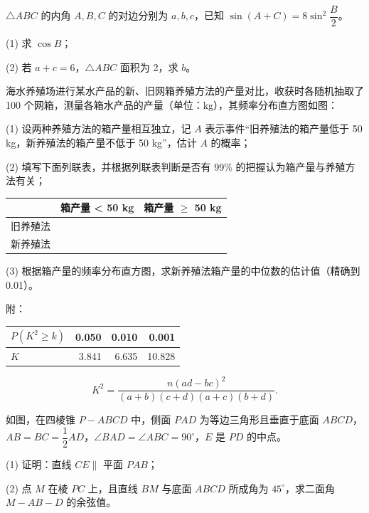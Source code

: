 \begin{question}
\(\triangle ABC\) 的内角 \(A,B,C\) 的对边分别为 \(a,b,c\)，已知 \(\sin(A+C)=8\sin^2\dfrac{B}{2}\)。

   (1) 求 \(\cos B\)；

   (2) 若 \(a+c=6\)，\(\triangle ABC\) 面积为 2，求 \(b\)。

\Needspace{0.4\textheight}
\end{question}
\begin{question}
海水养殖场进行某水产品的新、旧网箱养殖方法的产量对比，收获时各随机抽取了 100 个网箱，测量各箱水产品的产量（单位：kg），其频率分布直方图如图：
\nopagebreak[4]
\begin{center}\end{center}
\nopagebreak[4]
   (1) 设两种养殖方法的箱产量相互独立，记 \(A\) 表示事件“旧养殖法的箱产量低于 50 kg，新养殖法的箱产量不低于 50 kg”，估计 \(A\) 的概率；

   (2) 填写下面列联表，并根据列联表判断是否有 99\% 的把握认为箱产量与养殖方法有关；

\begin{center}
\begin{tabular}{lrr}
\toprule
 & 箱产量 < 50 kg & 箱产量 $\geq$ 50 kg \\
\midrule
旧养殖法 &  &  \\
新养殖法 &  &  \\
\bottomrule
\end{tabular}
\end{center}

   (3) 根据箱产量的频率分布直方图，求新养殖法箱产量的中位数的估计值（精确到 0.01）。

   附：

\begin{center}
\begin{tabular}{lrrr}
\toprule
\(P(K^2\geq k)\) & 0.050 & 0.010 & 0.001 \\
\midrule
\(K\) & 3.841 & 6.635 & 10.828 \\
\bottomrule
\end{tabular}
\end{center}

\nopagebreak[4]
   \[
   K^2=\frac{n(ad-bc)^2}{(a+b)(c+d)(a+c)(b+d)}.
   \]

\Needspace{0.4\textheight}
\end{question}
\begin{question}
如图，在四棱锥 \(P-ABCD\) 中，侧面 \(PAD\) 为等边三角形且垂直于底面 \(ABCD\)，\(AB=BC=\dfrac{1}{2}AD\)，\(\angle BAD=\angle ABC=90^\circ\)，\(E\) 是 \(PD\) 的中点。
\nopagebreak[4]
\begin{center}\end{center}
\nopagebreak[4]
   (1) 证明：直线 \(CE\parallel\) 平面 \(PAB\)；

   (2) 点 \(M\) 在棱 \(PC\) 上，且直线 \(BM\) 与底面 \(ABCD\) 所成角为 \(45^\circ\)，求二面角 \(M-AB-D\) 的余弦值。

\end{question}

